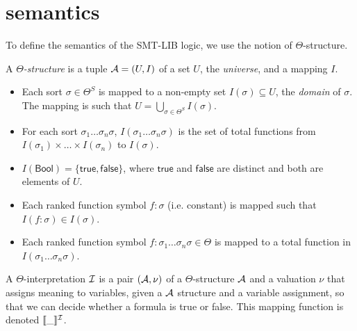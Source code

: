 \section{semantics}

To define the semantics of the SMT-LIB logic, we use the notion of $\Theta$-structure.

\begin{definition} A \emph{$\Theta$-structure} is a tuple $\cal{A} = (U, I)$ of a set $U$, the \emph{universe}, and a mapping $I$.
\begin{itemize}
    \item Each sort $\sigma \in \Theta^{S}$ is mapped to a non-empty set $I(\sigma) \subseteq U$, the \emph{domain} of $\sigma$.  
    The mapping is such that $U = \bigcup_{\sigma \in \Theta^{S}} I(\sigma)$.
    \item For each sort $\sigma_1 \dots \sigma_n \sigma$, $I(\sigma_1 \dots \sigma_n \sigma)$ is the set of total functions from $I(\sigma_1) \times \dots \times I(\sigma_n)$ to $I(\sigma)$.
    \item $I(\mathsf{Bool}) = \{\mathsf{true}, \mathsf{false}\}$, where $\mathsf{true}$ and $\mathsf{false}$ are distinct and both are elements of $U$.
    \item Each ranked function symbol $f:\sigma$ (i.e. constant) is mapped such that $I(f : \sigma) \in I(\sigma)$.
    \item Each ranked function symbol $f : \sigma_1 \dots \sigma_n \sigma \in \Theta$ is mapped to a total function in $I(\sigma_1 \dots \sigma_n \sigma)$.
\end{itemize}
\end{definition}



A $\Theta$-interpretation $\cal{I}$ is a pair $(\cal{A}, \nu)$ of a $\Theta$-structure $\cal{A}$ and a valuation $\nu$
that assigns meaning to variables, given a $\cal{A}$ structure and a variable assignment, so that we can decide whether a formula is true or false.
This mapping  function is denoted $\llbracket \_ \rrbracket^{\cal{I}}$.

